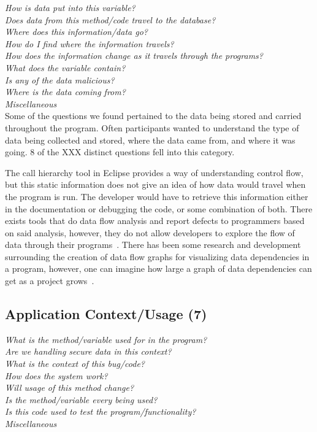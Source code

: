 \documentclass[conference]{IEEEtran}
\begin{document}
\noindent\emph{How is data put into this variable?} \\
\emph{Does data from this method/code travel to the database?} \\
\emph{Where does this information/data go?} \\
\emph{How do I find where the information travels?} \\
\emph{How does the information change as it travels through the programs?} \\
\emph{What does the variable contain?} \\
\emph{Is any of the data malicious?} \\
\emph{Where is the data coming from?} \\
\emph{Miscellaneous} \\

Some of the questions we found pertained to the data being stored and carried throughout the program. Often participants wanted to understand  the type of data being collected and stored, where the data came from, and where it was going. 8 of the XXX distinct questions fell into this category.

The call hierarchy tool in Eclipse provides a way of understanding control flow, but this static information does not give an idea of how data would travel when the program is run. The developer would have to retrieve this information either in the documentation or debugging the code, or some combination of both. There exists tools that do data flow analysis and report defects to programmers based on said analysis, however, they do not allow developers to explore the flow of data through their programs~\cite{jovanovic2006pixy}. There has been some research and development surrounding the creation of data flow graphs for visualizing data dependencies in a program, however, one can imagine how large a graph of data dependencies can get as a project grows~\cite{ghosh2001method, ferrante1987program}.



\noindent\subsection{\textbf{Application Context/Usage (7)}}

\noindent\emph{What is the method/variable used for in the program?} \\
\emph{Are we handling secure data in this context?} \\
\emph{What is the context of this bug/code?} \\
\emph{How does the system work?} \\
\emph{Will usage of this method change?} \\
\emph{Is the method/variable every being used?} \\
\emph{Is this code used to test the program/functionality?} \\
\emph{Miscellaneous} \\
\end{document}
